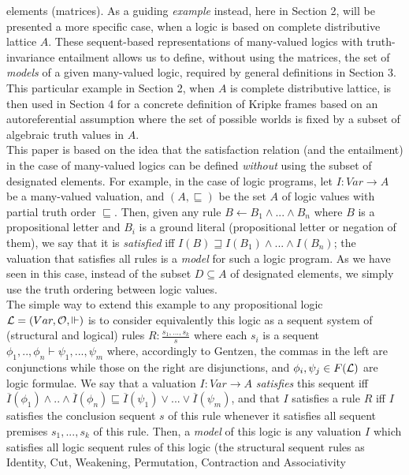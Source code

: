\documentclass[10pt,twocolumn]{article}
\renewcommand{\O}{\mathcal{O}} \renewcommand{\P}{\mathcal{P}}
\begin{document}
elements (matrices). As a guiding
 \emph{example} instead, here in Section 2, will be presented a more specific
 case, when a  logic is based on complete distributive lattice $A$.
These sequent-based
representations of many-valued logics with truth-invariance
entailment allows us to define, without using the matrices, the set
of \emph{models} of a given many-valued logic, required by  general
definitions in Section 3. This particular example in Section 2, when
$A$ is complete distributive lattice, is then used in Section 4 for
a concrete definition of Kripke frames based on an autoreferential
assumption \cite{Majk06ml} where the set of possible worlds is fixed
by a subset of algebraic truth values in $A$.
\\
This paper is based on the idea that the satisfaction relation (and
the entailment) in the case of many-valued logics can be defined
\emph{without} using the subset of designated elements.
For example, in the case of logic programs,
let $I:Var \rightarrow A$ be a many-valued valuation, and $(A,
\sqsubseteq)$ be the set $A$ of logic values with
 partial truth order $\sqsubseteq$. Then, given any rule $B
\leftarrow B_1 \wedge ... \wedge B_n$ where $B$ is a propositional
letter and $B_i$ is a ground literal (propositional letter or
negation of them), we say that it is \emph{satisfied}  iff $I(B)
\sqsupseteq I(B_1) \wedge ... \wedge I(B_n)$; the valuation that
satisfies all rules is a \emph{model} for such a logic program. As
we have seen in this case, instead of the subset $D \subseteq A$ of
designated
elements, we simply use the truth ordering between logic values.\\
  The simple way to extend this example to any
propositional logic $\L = (Var, \O, \Vdash)$ is to consider
equivalently this logic as a sequent system of (structural and
logical) rules $R: \frac{s_1, ..., s_k}{s}$ where each $s_i$ is a
sequent $\phi_1,..,\phi_n \vdash \psi_1,...,\psi_m$ where,
accordingly to Gentzen, the commas in the left are conjunctions
while those on the right are disjunctions, and $\phi_i, \psi_j \in
F(\mathcal{L})$ are logic formulae. We say that a valuation $I:Var
\rightarrow A$ \emph{satisfies} this sequent iff
$\overline{I}(\phi_1) \wedge..\wedge \overline{I}(\phi_n)
\sqsubseteq \overline{I}(\psi_1) \vee...\vee \overline{I}(\psi_m)$,
and that $I$ satisfies a rule $R$ iff $I$ satisfies the conclusion
sequent $s$ of this rule whenever it satisfies all sequent premises
$s_1, ..., s_k$ of this rule. Then, a \emph{model} of this logic is
any valuation $I$ which satisfies all
 logic sequent rules of this logic (the structural sequent rules as Identity, Cut, Weakening, Permutation, Contraction and Associativity
\end{document}
